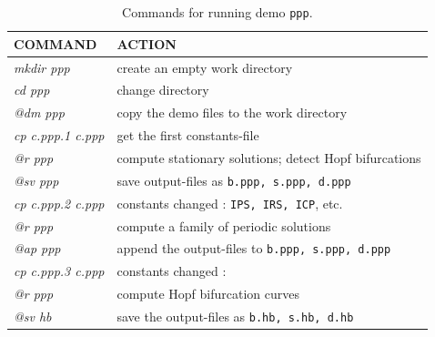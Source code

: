 \documentclass[12pt]{report}
\begin{document}
\begin{table}[htbp]
\begin{center}
\begin{tabular}{| l | l |}
\hline
  COMMAND  & ACTION \\
\hline
  {\it mkdir ppp} & create an empty work directory \\ 
  {\it cd ppp} & change directory \\
  {\it @dm ppp} & copy the demo files to the work directory \\
\hline
  {\it cp c.ppp.1 c.ppp} & get the first constants-file \\ 
  {\it @r ppp} & compute stationary solutions; detect Hopf bifurcations \\ 
  {\it @sv ppp} & save output-files as {\tt b.ppp, s.ppp, d.ppp} \\ 
\hline
  {\it cp c.ppp.2 c.ppp} & constants changed : {\tt IPS, IRS, ICP}, etc.  \\ 
  {\it @r ppp} & compute a family of periodic solutions \\ 
  {\it @ap ppp} & append the output-files to {\tt b.ppp, s.ppp, d.ppp} \\ 
\hline

  {\it cp c.ppp.3 c.ppp} & constants changed : \\ 
  {\it @r ppp} & compute Hopf bifurcation curves \\ 
  {\it @sv hb} & save the output-files as {\tt b.hb, s.hb, d.hb} \\ 
\hline
\end{tabular}
\caption{Commands for running demo {\tt ppp}.}
\label{tbl:demo_ppp_1}
\end{center}
\end{table}


\newpage
\end{document}
